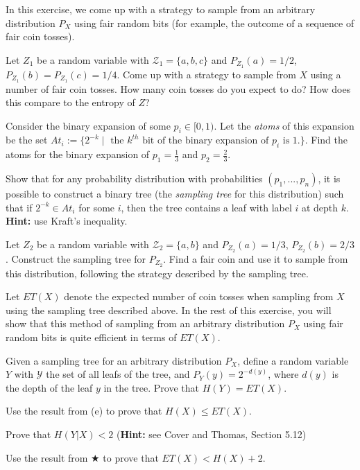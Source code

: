 \documentclass[a4paper,10pt,landscape,twocolumn]{scrartcl}
\begin{document}
\begin{exercise}
In this exercise, we come up with a strategy to sample from an arbitrary distribution $P_X$ using fair random bits (for example, the outcome of a sequence of fair coin tosses).
	\begin{subex}
	Let $Z_1$ be a random variable with $\mathcal{Z}_1 = \{a,b,c\}$ and $P_{Z_1}(a) = 1/2$, $P_{Z_1}(b) = P_{Z_1}(c) = 1/4$. Come up with a strategy to sample from $X$ using a number of fair coin tosses. How many coin tosses do you expect to do? How does this compare to the entropy of $Z$?
	\end{subex}
	\begin{subex}
	Consider the binary expansion of some $p_i \in [0,1)$. Let the \emph{atoms} of this expansion be the set $At_i := \{2^{-k} \mid \mbox{ the } k^{th} \mbox{ bit of the binary expansion of } p_i \mbox{ is 1.}\}$. Find the atoms for the binary expansion of $p_1 = \frac{1}{3}$ and $p_2 = \frac{2}{3}$.
	\end{subex}
	\begin{subex}
	Show that for any probability distribution with probabilities $(p_1, ..., p_n)$, it is possible to construct a binary tree (the \emph{sampling tree} for this distribution) such that if $2^{-k} \in At_i$ for some $i$, then the tree contains a leaf with label $i$ at depth $k$. \textbf{Hint:} use Kraft's inequality.
	\end{subex}
	\begin{subex}
	Let $Z_2$ be a random variable with $\mathcal{Z}_2 = \{a,b\}$ and $P_{Z_2}(a) = 1/3$, $P_{Z_2}(b) = 2/3$. Construct the sampling tree for $P_{Z_2}$. Find a fair coin and use it to sample from this distribution, following the strategy described by the sampling tree.
	\end{subex}
Let $ET(X)$ denote the expected number of coin tosses when sampling from $X$ using the sampling tree described above. In the rest of this exercise, you will show that this method of sampling from an arbitrary distribution $P_X$ using fair random bits is quite efficient in terms of $ET(X)$.
	\begin{subex}
	Given a sampling tree for an arbitrary distribution $P_X$, define a random variable $Y$ with $\mathcal{Y}$ the set of all leafs of the tree, and $P_Y(y) = 2^{-d(y)}$, where $d(y)$ is the depth of the leaf $y$ in the tree. Prove that $H(Y) = ET(X)$.
	\end{subex}
	\begin{subex}
	Use the result from (e) to prove that $H(X) \leq ET(X)$.
	\end{subex}
	\begin{subex**}
	Prove that $H(Y|X) < 2$ (\textbf{Hint:} see Cover and Thomas, Section 5.12)
	\end{subex**}
	\begin{subex}
	Use the result from $\bigstar$ to prove that $ET(X) < H(X) + 2$.
	\end{subex}
\end{exercise}
\end{document}
